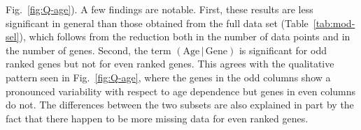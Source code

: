 \documentclass[letterpaper]{article}
\begin{document}
\begin{table}[H]
{Fig.~\ref{fig:Q-age}).  A few findings are notable.  First, these results are
less significant in general than those obtained from the full data set
(Table~\ref{tab:mod-sel}), which follows from the reduction both in the number
of data points and in the number of genes.  Second, the term
\((\mathrm{Age}\,|\,\mathrm{Gene})\) is significant for odd ranked genes but
not for even ranked genes.  This agrees with the qualitative pattern seen in
Fig.~\ref{fig:Q-age}, where the genes in the odd columns show a pronounced
variability with respect to age dependence but genes in even columns do not.
The differences between the two subsets are also explained in part by the fact
that there happen to be more missing data for even ranked genes.
}
\label{tab:mod-sel-sset}
\end{table}
\end{document}
